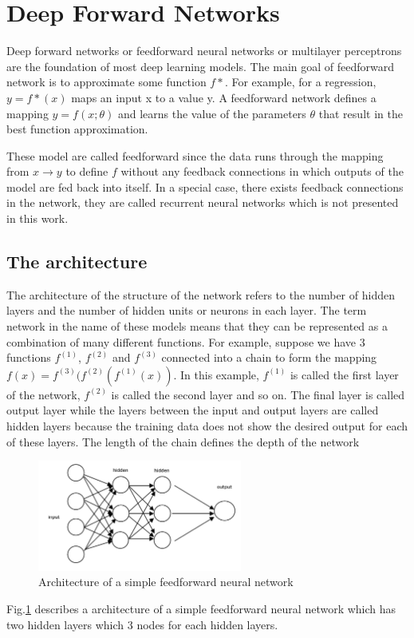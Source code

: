 \section{Deep Forward Networks}
\hspace{0.5cm} Deep forward networks or feedforward neural networks or multilayer perceptrons are the foundation of most deep learning models. The main goal of feedforward network is to approximate some function $f*$. For example, for a regression, $y = f*(x)$ maps an input x to a value y. A feedforward network defines a mapping $y = f(x;\theta)$ and learns the value of the parameters $\theta$ that result in the best function approximation.\par
These model are called feedforward since the data runs through the mapping from $x \rightarrow y$ to define $f$ without any feedback connections in which outputs of the model are fed back into itself. In a special case, there exists feedback connections in the network, they are called recurrent neural networks which is not presented in this work.
\pagebreak

\subsection{The architecture}
The architecture of the structure of the network refers to the number of hidden layers and the number of hidden units or neurons in each layer. The term network in the name of these models means that they can be represented as a combination of many different functions. For example, suppose we have 3 functions $f^{(1)}$, $f^{(2)}$ and $f^{(3)}$ connected into a chain to form the mapping $f(x) = f^{(3)}(f^{(2)}(f^{(1)}(x))$. In this example, $f^{(1)}$ is called the first layer of the network, $f^{(2)}$ is called the second layer and so on. The final layer is called output layer while the layers between the input and output layers are called hidden layers because the training data does not show the desired output for each of these layers. The length of the chain defines the depth of the network
\begin{figure}[h!]
    \centering
    \includegraphics[width=0.6\textwidth]{Chapters/Fig/architecture_mlp.png}
    \caption{Architecture of a simple feedforward neural network}
    \label{fig:arch_mlp}
\end{figure}
\par Fig.\ref{fig:arch_mlp} describes a architecture of a simple feedforward neural network which has two hidden layers which 3 nodes for each hidden layers.
